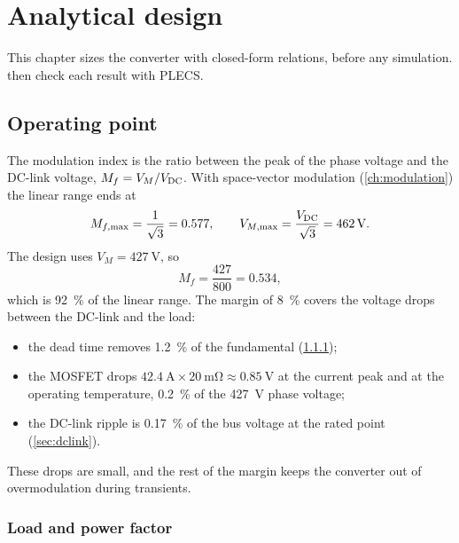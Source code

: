 \chapter{Analytical design}
\label{ch:analytical}

This chapter sizes the converter with closed-form relations, before any
simulation.  then check each result with PLECS.

\section{Operating point}

The modulation index is the ratio between the peak of the phase voltage
and the DC-link voltage, $M_f = V_M/V_{\mathrm{DC}}$. With space-vector
modulation (\cref{ch:modulation}) the linear range ends at
%
\begin{equation}
  M_{f,\max} = \frac{1}{\sqrt{3}} = 0.577 ,
  \qquad
  V_{M,\max} = \frac{\Vdc}{\sqrt{3}} = \SI{462}{\volt} .
  \label{eq:svpwm-limit}
\end{equation}
%
The design uses $V_M = \SI{427}{\volt}$, so
%
\begin{equation}
  M_f = \frac{427}{800} = 0.534 ,
\end{equation}
%
which is \SI{92}{\percent} of the linear range. The margin of
\SI{8}{\percent} covers the voltage drops between the DC-link and the load:
\begin{itemize}
  \item the dead time removes \SI{1.2}{\percent} of the fundamental
        (\cref{sec:powerfactor});
  \item the MOSFET drops $\SI{42.4}{\ampere} \times \SI{20}{\milli\ohm}
        \approx \SI{0.85}{\volt}$ at the current peak and at the operating
        temperature, \SI{0.2}{\percent} of the \SI{427}{\volt} phase voltage;
  \item the DC-link ripple is \SI{0.17}{\percent} of the bus voltage at the
        rated point (\cref{sec:dclink}).
\end{itemize}
These drops are small, and the rest of the margin keeps the converter out of
overmodulation during transients.

\subsection{Load and power factor}
\label{sec:powerfactor}

